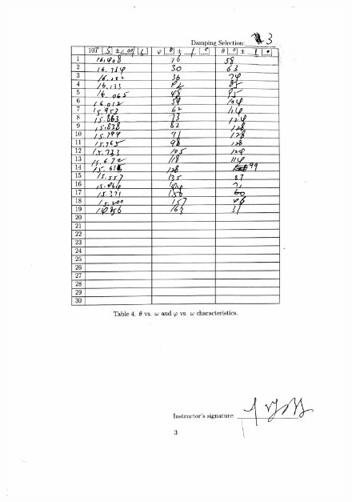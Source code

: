 \documentclass[a4paper]{report}
\begin{document}
	\begin{figure}[H]
		\centering
		\includegraphics[width=1\linewidth]{12.jpg}
	\end{figure}
\end{document}
